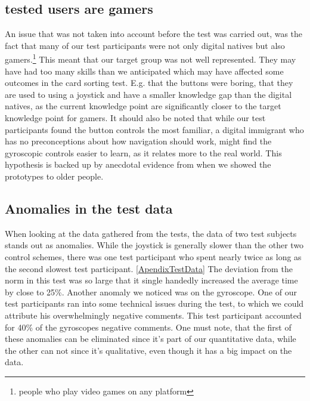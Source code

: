 \subsection*{tested users are gamers} \label{TestedUsersAreGamers}
An issue that was not taken into account before the test was carried out, was the fact that many of our test participants were not only digital natives but also gamers.\footnote{people  who play video games on any platform} This meant that our target group was not well represented. They may have had too many skills than we anticipated which may have affected some outcomes in the card sorting test. E.g. that the buttons were boring, that they are used to using a joystick and have a smaller knowledge gap than the digital natives, as the current knowledge point are significantly closer to the target knowledge point for gamers. 
It should also be noted that while our test participants found the button controls the most familiar, a digital immigrant who has no preconceptions about how navigation should work, might find the gyroscopic controls easier to learn, as it relates more to the real world. This hypothesis is backed up by anecdotal evidence from when we showed the prototypes to older people. 
\subsection*{Anomalies in the test data}
When looking at the data gathered from the tests, the data of two test subjects stands out as anomalies. While the joystick is generally slower than the other two control schemes, there was one test participant who spent nearly twice as long as the second slowest test participant. \ref{ApendixTestData}
The deviation from the norm in this test was so large that it single handedly increased the average time by close to 25\%.
Another anomaly we noticed was on the gyroscope. One of our test participants ran into some technical issues during the test, to which we could attribute his overwhelmingly negative comments. This test participant accounted for 40\% of the gyroscopes negative comments.
One must note, that the first of these anomalies can be eliminated since it's part of our quantitative data, while the other can not since it's qualitative, even though it has a big impact on the data. %

